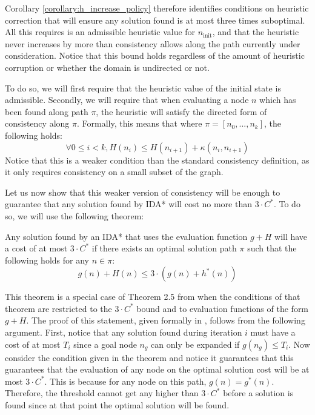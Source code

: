 Corollary \ref{corollary:h_increase_policy} therefore identifies conditions on heuristic correction that will ensure any solution found is at most three times suboptimal.
All this requires is an admissible heuristic value for $n_{\mathrm{init}}$, and that the heuristic never increases by more than consistency allows along the path currently under consideration.
Notice that this bound holds regardless of the amount of heuristic corruption or whether the domain is undirected or not.

















To do so, we will first require that the heuristic value of the initial state is admissible.
Secondly, we will require that when evaluating a node $n$ which has been found along path $\pi$, the heuristic will satisfy the directed form of consistency along $\pi$.
Formally, this means that where $\pi=[n_0, ..., n_k]$, the following holds:
$$\forall 0 \leq i < k, H(n_i) \leq H(n_{i+1}) + \kappa(n_i, n_{i+1})$$
Notice that this is a weaker condition than the standard consistency definition, as it only requires consistency on a small subset of the graph.

Let us now show that this weaker version of consistency will be enough to guarantee that any solution found by IDA* will cost no more than $3 \cdot C^*$.
To do so, we will use the following theorem:
\begin{theorem}
\label{theorem:sufficient_for_3C}
Any solution found by an IDA* that uses the evaluation function $g + H$ will have a cost of at most $3 \cdot C^*$ if there exists an optimal solution path $\pi$ such that the following holds for any $n \in \pi$:
$$g(n) + H(n) \leq 3 \cdot (g(n) + h^*(n))$$
\end{theorem}
This theorem is a special case of Theorem 2.5 from \cite{Valenzano:alternative_bounding} when the conditions of that theorem are restricted to the $3\cdot C^*$ bound and to evaluation functions of the form $g + H$.
The proof of this statement, given formally in \cite{Valenzano:alternative_bounding}, follows from the following argument.
First, notice that any solution found during iteration $i$ must have a cost of at most $T_i$ since a goal node $n_g$ can only be expanded if $g(n_g) \leq T_i$.
Now consider the condition given in the theorem and notice it guarantees that this guarantees that the evaluation of any node on the optimal solution cost will be at most $3 \cdot C^*$.
This is because for any node on this path, $g(n)=g^*(n)$.
Therefore, the threshold cannot get any higher than $3 \cdot C^*$ before a solution is found since at that point the optimal solution will be found.


